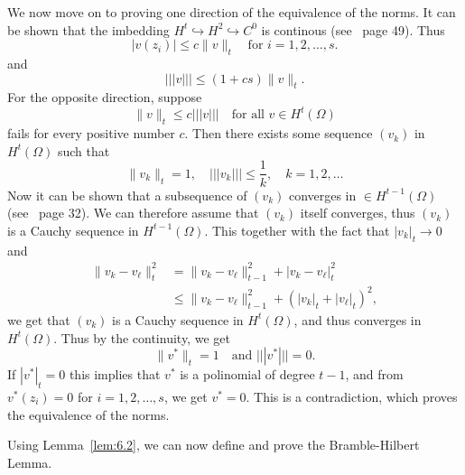 \begin{bev}
We now move on to proving one direction of the equivalence of the norms. 
It can be shown that the imbedding $H^t\hookrightarrow H^2 \hookrightarrow C^0$ is continous (see~\cite{Braess} page 49). Thus
\begin{equation*}
    |v(z_i)|\leq c\|v\|_t\quad \text{for } i=1,2,\ldots,s.
\end{equation*} 
and
\begin{equation*}
    |||v|||\leq (1+cs)\|v\|_t.
\end{equation*}
For the opposite direction, suppose 
\begin{equation*}
    \|v\|_t\leq c|||v|||\quad \text{for all } v\in H^t(\Omega)
\end{equation*}
fails for every positive number $c$. Then there exists some sequence $(v_k)$ in $H^t(\Omega)$ such that
\begin{equation*}
    \|v_k\|_t=1,\quad |||v_k|||\leq \frac{1}{k},\quad k=1,2,\ldots
\end{equation*}
Now it can be shown that a subsequence of $(v_k)$ converges in $\in H^{t-1}(\Omega)$ (see~\cite{Braess} page 32). We can therefore assume that $(v_k)$ itself converges, thus $(v_k)$ is a Cauchy sequence in $H^{t-1}(\Omega)$.
This together with the fact that $|v_k|_t\to 0$ and
\begin{align*}
    \|v_k-v_\ell\|_t^2 &= \|v_k-v_\ell\|_{t-1}^2 + |v_k-v_\ell|_t^2 \\
    & \leq\|v_k-v_\ell\|_{t-1}^2 + {(|v_k|_t + |v_\ell|_t)}^2 ,
\end{align*}
 we get that $(v_k)$ is a Cauchy sequence in $H^t(\Omega)$, and thus converges in $H^t(\Omega)$.
Thus by the continuity, we get 
\begin{equation}
    \|v^*\|_t = 1\quad \text{and }|||v^*|||=0. 
\end{equation}
If $|v^*|_t = 0$ this implies that $v^*$ is a polinomial of degree $t-1$, and from $v^*(z_i)=0$ for $i=1,2,\ldots,s$, we get $v^*=0$. 
This is a contradiction, which proves the equivalence of the norms. %
\end{bev}

Using Lemma~\ref{lem:6.2}, we can now define and prove the Bramble-Hilbert Lemma.

